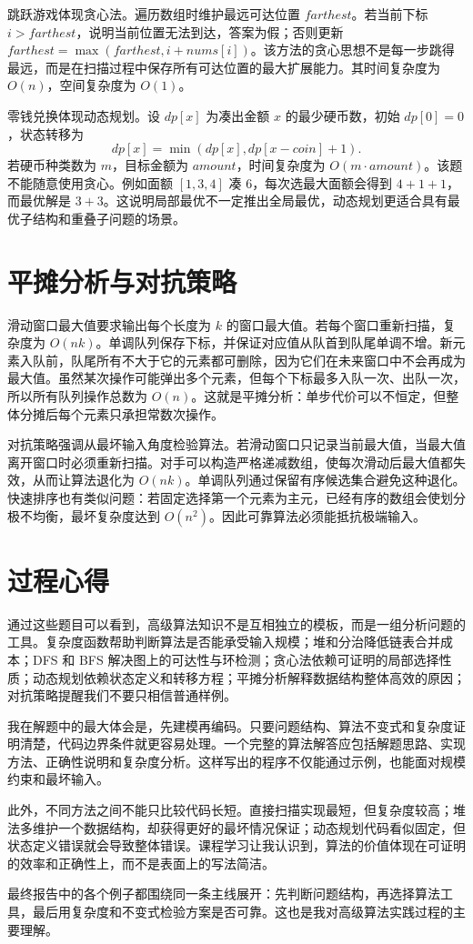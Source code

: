 \documentclass[UTF8,a4paper,12pt]{ctexart}
\begin{document}
跳跃游戏体现贪心法。遍历数组时维护最远可达位置 $farthest$。若当前下标 $i>farthest$，说明当前位置无法到达，答案为假；否则更新 $farthest=\max(farthest,i+nums[i])$。该方法的贪心思想不是每一步跳得最远，而是在扫描过程中保存所有可达位置的最大扩展能力。其时间复杂度为 $O(n)$，空间复杂度为 $O(1)$。

零钱兑换体现动态规划。设 $dp[x]$ 为凑出金额 $x$ 的最少硬币数，初始 $dp[0]=0$，状态转移为
\[
dp[x]=\min(dp[x],dp[x-coin]+1).
\]
若硬币种类数为 $m$，目标金额为 $amount$，时间复杂度为 $O(m\cdot amount)$。该题不能随意使用贪心。例如面额 $[1,3,4]$ 凑 $6$，每次选最大面额会得到 $4+1+1$，而最优解是 $3+3$。这说明局部最优不一定推出全局最优，动态规划更适合具有最优子结构和重叠子问题的场景。

\section{平摊分析与对抗策略}

滑动窗口最大值要求输出每个长度为 $k$ 的窗口最大值。若每个窗口重新扫描，复杂度为 $O(nk)$。单调队列保存下标，并保证对应值从队首到队尾单调不增。新元素入队前，队尾所有不大于它的元素都可删除，因为它们在未来窗口中不会再成为最大值。虽然某次操作可能弹出多个元素，但每个下标最多入队一次、出队一次，所以所有队列操作总数为 $O(n)$。这就是平摊分析：单步代价可以不恒定，但整体分摊后每个元素只承担常数次操作。

对抗策略强调从最坏输入角度检验算法。若滑动窗口只记录当前最大值，当最大值离开窗口时必须重新扫描。对手可以构造严格递减数组，使每次滑动后最大值都失效，从而让算法退化为 $O(nk)$。单调队列通过保留有序候选集合避免这种退化。快速排序也有类似问题：若固定选择第一个元素为主元，已经有序的数组会使划分极不均衡，最坏复杂度达到 $O(n^2)$。因此可靠算法必须能抵抗极端输入。

\section{过程心得}

通过这些题目可以看到，高级算法知识不是互相独立的模板，而是一组分析问题的工具。复杂度函数帮助判断算法是否能承受输入规模；堆和分治降低链表合并成本；DFS 和 BFS 解决图上的可达性与环检测；贪心法依赖可证明的局部选择性质；动态规划依赖状态定义和转移方程；平摊分析解释数据结构整体高效的原因；对抗策略提醒我们不要只相信普通样例。

我在解题中的最大体会是，先建模再编码。只要问题结构、算法不变式和复杂度证明清楚，代码边界条件就更容易处理。一个完整的算法解答应包括解题思路、实现方法、正确性说明和复杂度分析。这样写出的程序不仅能通过示例，也能面对规模约束和最坏输入。

此外，不同方法之间不能只比较代码长短。直接扫描实现最短，但复杂度较高；堆法多维护一个数据结构，却获得更好的最坏情况保证；动态规划代码看似固定，但状态定义错误就会导致整体错误。课程学习让我认识到，算法的价值体现在可证明的效率和正确性上，而不是表面上的写法简洁。

最终报告中的各个例子都围绕同一条主线展开：先判断问题结构，再选择算法工具，最后用复杂度和不变式检验方案是否可靠。这也是我对高级算法实践过程的主要理解。
\end{document}
